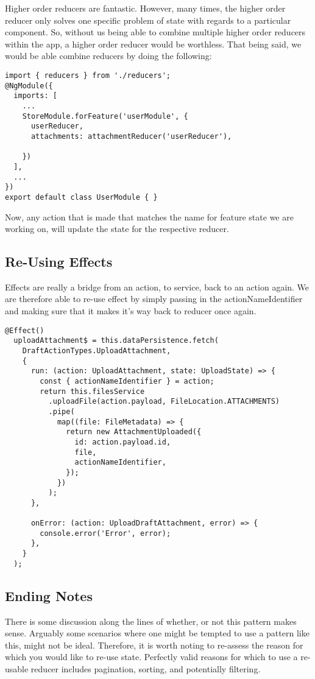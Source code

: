 Higher order reducers are fantastic. However, many times, the higher order
reducer only solves one specific problem of state with regards to a particular
component. So, without us being able to combine multiple higher order reducers
within the app, a higher order reducer would be worthless. That being said, we
would be able combine reducers by doing the following:

\begin{lstlisting}
import { reducers } from './reducers';
@NgModule({
  imports: [
    ...
    StoreModule.forFeature('userModule', {
      userReducer,
      attachments: attachmentReducer('userReducer'),

    })
  ],
  ...
})
export default class UserModule { }
\end{lstlisting}

Now, any action that is made that matches the name for feature state we are
working on, will update the state for the respective reducer.

\subsection{Re-Using Effects}
Effects are really a bridge from an action, to service, back to an action again.
We are therefore able to re-use effect by simply passing in the
actionNameIdentifier and making sure that it makes it's way back to reducer
once again.
\begin{lstlisting}
@Effect()
  uploadAttachment$ = this.dataPersistence.fetch(
    DraftActionTypes.UploadAttachment,
    {
      run: (action: UploadAttachment, state: UploadState) => {
        const { actionNameIdentifier } = action;
        return this.filesService
          .uploadFile(action.payload, FileLocation.ATTACHMENTS)
          .pipe(
            map((file: FileMetadata) => {
              return new AttachmentUploaded({
                id: action.payload.id,
                file,
                actionNameIdentifier,
              });
            })
          );
      },

      onError: (action: UploadDraftAttachment, error) => {
        console.error('Error', error);
      },
    }
  );
\end{lstlisting}

\subsection{ Ending Notes }
There is some discussion along the lines of whether, or not this pattern makes
sense. Arguably some scenarios where one might be tempted to use a pattern like
this, might not be ideal. Therefore, it is worth noting to re-assess the reason
for which you would like to re-use state. Perfectly valid reasons for which to
use a re-usable reducer includes pagination, sorting, and potentially filtering. 
